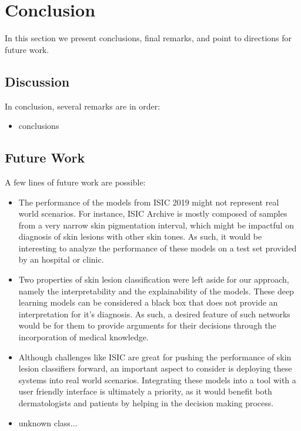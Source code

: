 \chapter{Conclusion}
\label{chapter:conclusion}

In this section we present conclusions, final remarks, and point to directions for future work.

\section{Discussion}

    In conclusion, several remarks are in order:
    
    \begin{itemize}
        \item conclusions
    \end{itemize}

\section{Future Work}

    A few lines of future work are possible:

    \begin{itemize}
        \item The performance of the models from ISIC 2019 might not represent real world scenarios. For instance, ISIC Archive is mostly composed of samples from a very narrow skin pigmentation interval, which might be impactful on diagnosis of skin lesions with other skin tones. As such, it would be interesting to analyze the performance of these models on a test set provided by an hospital or clinic.
        \item Two properties of skin lesion classification were left aside for our approach, namely the interpretability and the explainability of the models. These deep learning models can be considered a black box that does not provide an interpretation for it's diagnosis. As such, a desired feature of such networks would be for them to provide arguments for their decisions through the incorporation of medical knowledge.
        \item Although challenges like ISIC are great for pushing the performance of skin lesion classifiers forward, an important aspect to consider is deploying these systems into real world scenarios. Integrating these models into a tool with a user friendly interface is ultimately a priority, as it would benefit both dermatologists and patients by helping in the decision making process.
        \item unknown class...
    \end{itemize}
